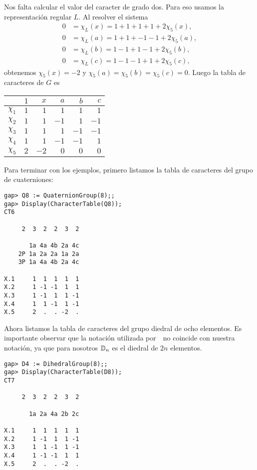 \begin{example}
	Nos falta calcular el valor del caracter de grado dos. Para eso usamos la
	representación regular $L$. Al resolver el sistema 
	\begin{align*}
		0&=\chi_L(x)=1+1+1+1+2\chi_5(x),\\
		0&=\chi_L(a)=1+1+-1-1+2\chi_5(a),\\
		0&=\chi_L(b)=1-1+1-1+2\chi_5(b),\\
		0&=\chi_L(c)=1-1-1+1+2\chi_5(c),
	\end{align*}
	obtenemos $\chi_5(x)=-2$ y $\chi_5(a)=\chi_5(b)=\chi_5(c)=0$. Luego la
	tabla de caracteres de $G$ es 
	\begin{center}
		\begin{tabular}{|c|rrrrr|}
			\hline
			& $1$ & $x$ & $a$ & $b$ & $c$\tabularnewline
			\hline
			$\chi_1$ & $1$ & $1$ & $1$ & $1$ & $1$\tabularnewline
			$\chi_2$ & $1$ & $1$ & $-1$ & $1$ & $-1$\tabularnewline
			$\chi_3$ & $1$ & $1$ & $1$ & $-1$ & $-1$\tabularnewline
			$\chi_4$ & $1$ & $1$ & $-1$ & $-1$ & $1$\tabularnewline
			$\chi_5$ & $2$ & $-2$ & $0$ & $0$ & $0$\tabularnewline
			\hline
		\end{tabular}
	\end{center}
	
	Para terminar con los ejemplos, primero listamos
	la tabla de caracteres del grupo de cuaterniones:
\begin{lstlisting}
gap> Q8 := QuaternionGroup(8);;
gap> Display(CharacterTable(Q8));
CT6

     2  3  2  2  3  2

       1a 4a 4b 2a 4c
    2P 1a 2a 2a 1a 2a
    3P 1a 4a 4b 2a 4c

X.1     1  1  1  1  1
X.2     1 -1 -1  1  1
X.3     1 -1  1  1 -1
X.4     1  1 -1  1 -1
X.5     2  .  . -2  .
\end{lstlisting}
Ahora listamos la tabla de caracteres del grupo diedral de ocho elementos. Es importante 
observar que la notación utilizada por~\GAP~no coincide con nuestra notación, ya que para nosotros $\mathbb{D}_n$ 
es el diedral de $2n$ elementos. 
\begin{lstlisting}
gap> D4 := DihedralGroup(8);;
gap> Display(CharacterTable(D8));
CT7

     2  3  2  2  3  2

       1a 2a 4a 2b 2c

X.1     1  1  1  1  1
X.2     1 -1  1  1 -1
X.3     1  1 -1  1 -1
X.4     1 -1 -1  1  1
X.5     2  .  . -2  .
\end{lstlisting}
\end{example}


